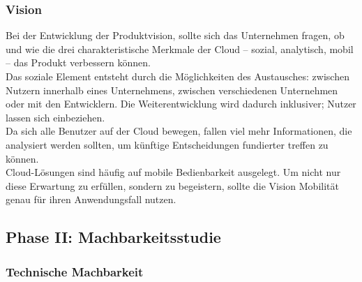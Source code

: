 \subsubsection{Vision}
Bei der Entwicklung der Produktvision, sollte sich das Unternehmen fragen, ob und wie die drei charakteristische Merkmale der Cloud -- sozial, analytisch, mobil -- das Produkt verbessern können.  \\
Das soziale Element entsteht durch die Möglichkeiten des Austausches: zwischen Nutzern innerhalb eines Unternehmens, zwischen verschiedenen Unternehmen oder mit den Entwicklern. Die Weiterentwicklung wird dadurch inklusiver; Nutzer lassen sich einbeziehen. \\
Da sich alle Benutzer auf der Cloud bewegen, fallen viel mehr Informationen, die analysiert werden sollten, um künftige Entscheidungen fundierter treffen zu können. \\
Cloud-Lösungen sind häufig auf mobile Bedienbarkeit ausgelegt. Um nicht nur diese Erwartung zu erfüllen, sondern zu begeistern, sollte die Vision Mobilität genau für ihren Anwendungsfall nutzen.
\begin{comment}
Hauptmotivation die Cloud zu Nutzen, sollte nicht die Reduktion von Kosten
sein, sondern strategische Vorteile, wie eine Konzentration auf das
Kerngeschäft, schnellere und effizientere Innovationsprozesse,
Produktivitätssteigerungen und eine IT, die das Business besser unterstützt,
womöglich sogar profitabel ist. \pcite{}{}{the_strategic_value_of_the_cloud}

Gerade weil die Migration in die Cloud große technische aber vor allem auch
geschäftliche Umwälzungen mit sich bringt, sollte die Migration wirtschaftlich
begründet werden, genauer gesagt:
strategisch. \pcite{}{}{challenges_and_assessment_in_migrating} Auch wenn die
Nutzung der Cloud Einsparungen ermöglicht, machen IT-Budgets in der Regel
nur einen geringen Prozentsatz des Umsatzes aus. Hauptmotivation für die
Migration in die Cloud sollten deshalb strategische Ziele sein, mit denen der
Umsatz ausgebaut oder zumindest behauptet wer
\end{comment}





\subsection{Phase II: Machbarkeitsstudie}
\subsubsection{Technische Machbarkeit}


